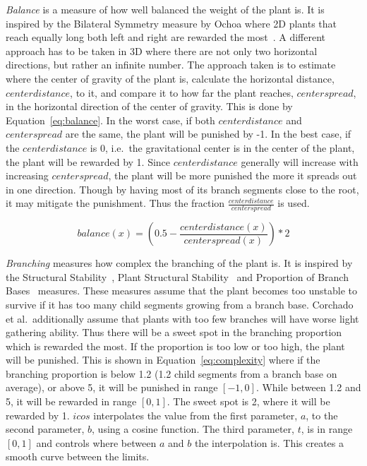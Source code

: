 \textit{Balance} is a measure of how well balanced the weight of the plant is.
It is inspired by the Bilateral Symmetry measure by Ochoa where 2D plants that reach equally long both left and right are rewarded the most~\cite{1998Ochoa}.
A different approach has to be taken in 3D where there are not only two horizontal directions, but rather an infinite number.
The approach taken is to estimate where the center of gravity of the plant is, calculate the horizontal distance, $centerdistance$, to it, and compare it to how far the plant reaches, $centerspread$, in the horizontal direction of the center of gravity.
This is done by Equation~\ref{eq:balance}.
In the worst case, if both $centerdistance$ and $centerspread$ are the same, the plant will be punished by -1.
In the best case, if the $centerdistance$ is 0, i.e.\ the gravitational center is in the center of the plant, the plant will be rewarded by 1.
Since $centerdistance$ generally will increase with increasing $centerspread$, the plant will be more punished the more it spreads out in one direction.
Though by having most of its branch segments close to the root, it may mitigate the punishment.
Thus the fraction $\frac{centerdistance}{centerspread}$ is used.

\begin{equation}
\label{eq:balance}
balance(x) = (0.5 - \frac{centerdistance(x)}{centerspread(x)}) * 2
\end{equation}

\textit{Branching} measures how complex the branching of the plant is.
It is inspired by the Structural Stability~\cite{1998Ochoa}, Plant Structural Stability~\cite{2009Corchado} and Proportion of Branch Bases~\cite{1998Ochoa} measures.
These measures assume that the plant becomes too unstable to survive if it has too many child segments growing from a branch base.
Corchado et al.\ additionally assume that plants with too few branches will have worse light gathering ability.
Thus there will be a sweet spot in the branching proportion which is rewarded the most.
If the proportion is too low or too high, the plant will be punished.
This is shown in Equation~\ref{eq:complexity} where if the branching proportion is below 1.2 (1.2 child segments from a branch base on average), or above 5, it will be punished in range $[-1, 0]$.
While between 1.2 and 5, it will be rewarded in range $[0, 1]$.
The sweet spot is 2, where it will be rewarded by 1.
$icos$ interpolates the value from the first parameter, $a$, to the second parameter, $b$, using a cosine function.
The third parameter, $t$, is in range $[0, 1]$ and controls where between $a$ and $b$ the interpolation is.
This creates a smooth curve between the limits.

